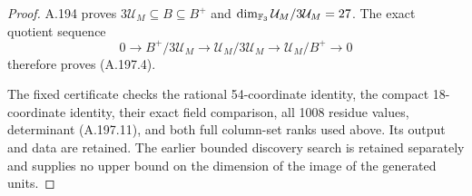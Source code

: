\begin{proof}
A.194 proves \(3\mathcal U_M\subseteq B\subseteq B^+\)
and \(\dim_{\mathbb F_3}\mathcal U_M/3\mathcal U_M=27\).
The exact quotient sequence
\[
 0\longrightarrow B^+/3\mathcal U_M
 \longrightarrow\mathcal U_M/3\mathcal U_M
 \longrightarrow\mathcal U_M/B^+\longrightarrow0
\tag{A.197.13}
\]
therefore proves (A.197.4).

The fixed certificate
checks the rational 54-coordinate identity, the compact
18-coordinate identity, their exact field comparison, all
1008 residue values, determinant (A.197.11), and both full
column-set ranks used above.  Its output
and data are retained.  The earlier bounded discovery search
is retained separately and supplies no upper bound on the
dimension of the image of the generated units.
\end{proof}
